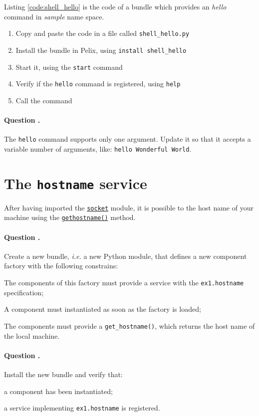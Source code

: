 \documentclass[a4paper, 12pt]{article}
\newcounter{question}
\newcommand\Question{%
  \stepcounter{question}%
  \paragraph{\hspace{2ex} Question \thequestion.}
}
\let\tempone\itemize
\let\temptwo\enditemize
\renewenvironment{itemize}{\tempone\addtolength{\itemsep}{-.5em}}{\temptwo}
\begin{document}
Listing \ref{code:shell_hello} is the code of a bundle which provides an \textit{hello} command in \textit{sample} name space.

\begin{enumerate}
\item Copy and paste the code in a file called \texttt{shell\_hello.py}
\item Install the bundle in Pelix, using \texttt{install shell\_hello}
\item Start it, using the \texttt{start} command
\item Verify if the \texttt{hello} command is registered, using \texttt{help}
\item Call the command
\end{enumerate}

\Question The \texttt{hello} command supports only one argument. Update it so that it accepts a variable number of arguments, like: \texttt{hello Wonderful World}.

\section{The \texttt{hostname} service}

After having imported the \href{https://docs.python.org/3/library/socket.html}{\texttt{socket}} module, it is possible to the host name of your machine using the \href{https://docs.python.org/3/library/socket.html#socket.gethostname}{\texttt{gethostname()}} method.

\Question Create a new bundle, \textit{i.e.} a new Python module, that defines a new component factory with the following constrains:
\begin{itemize}
\item The components of this factory must provide a service with the \texttt{ex1.hostname} specification;
\item A component must instantiated as soon as the factory is loaded;
\item The components must provide a \texttt{get\_hostname()}, which returns the host name of the local machine.
\end{itemize}

\Question Install the new bundle and verify that:
\begin{itemize}
\item a component has been instantiated;
\item a service implementing \texttt{ex1.hostname} is registered.
\end{itemize}
\end{document}
